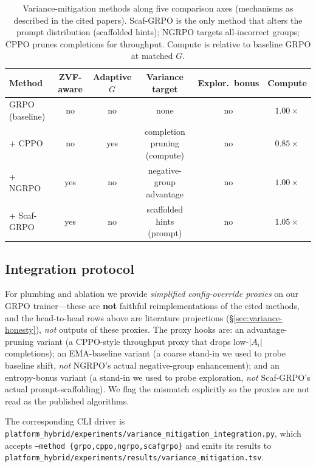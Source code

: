 \begin{table}[t]
  \centering
  \small
  \setlength{\tabcolsep}{4pt}
  \begin{tabular}{lccccc}
    \toprule
    \textbf{Method} &
    \textbf{ZVF-aware} &
    \textbf{Adaptive $G$} &
    \textbf{Variance target} &
    \textbf{Explor.\ bonus} &
    \textbf{Compute} \\
    \midrule
    GRPO (baseline)      & no  & no  & none                    & no  & $1.00\times$ \\
    + CPPO~\cite{lin2025cppo}       & no  & yes & completion pruning (compute) & no  & $0.85\times$ \\
    + NGRPO~\cite{nan2025ngrpo}     & yes & no  & negative-group advantage & no  & $1.00\times$ \\
    + Scaf-GRPO~\cite{zhang2025scaffgrpo} & yes & no  & scaffolded hints (prompt) & no  & $1.05\times$ \\
    \bottomrule
  \end{tabular}
  \caption{Variance-mitigation methods along five comparison axes (mechanisms as
  described in the cited papers). Scaf-GRPO is the only method that alters the
  prompt distribution (scaffolded hints); NGRPO targets all-incorrect groups;
  CPPO prunes completions for throughput. Compute is relative to baseline GRPO at
  matched $G$.}
  \label{tab:variance-axes}
\end{table}

\subsection{Integration protocol}
\label{sec:variance-integration}

For plumbing and ablation we provide \emph{simplified config-override proxies}
on our GRPO trainer---these are \textbf{not} faithful reimplementations of the
cited methods, and the head-to-head rows above are literature projections
(\S\ref{sec:variance-honesty}), \emph{not} outputs of these proxies. The proxy
hooks are: an advantage-pruning variant (a CPPO-style throughput proxy that drops
low-$|A_i|$ completions); an EMA-baseline variant (a coarse stand-in we used to
probe baseline shift, \emph{not} NGRPO's actual negative-group enhancement); and
an entropy-bonus variant (a stand-in we used to probe exploration, \emph{not}
Scaf-GRPO's actual prompt-scaffolding). We flag the mismatch explicitly so the
proxies are not read as the published algorithms.

The corresponding CLI driver is
\texttt{platform_hybrid/experiments/variance\_mitigation\_integration.py}, which
accepts \texttt{--method \{grpo,cppo,ngrpo,scafgrpo\}} and
emits its results to
\texttt{platform_hybrid/experiments/results/variance\_mitigation.tsv}.

